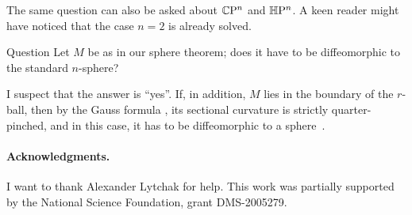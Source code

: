 \documentclass[a4paper,10pt]{article}
\begin{document}
The same question can also be asked about $\mathbb{C}\mathrm{P}^n$ and $\mathbb{H}\mathrm{P}^n$. 
A keen reader might have noticed that the case $n=2$ is already solved.

\begin{thm}{Question}
Let $M$ be as in our sphere theorem;
does it have to be diffeomorphic to the standard $n$-sphere?
\end{thm}


I suspect that the answer is ``yes''.
If, in addition, $M$ lies in the boundary of the $r$-ball, then by the Gauss formula \cite[Lemma 5]{petrunin2024}, its sectional curvature is strictly quarter-pinched,
and in this case, it has to be diffeomorphic to a sphere~\cite{brendle-schoen}.

\paragraph{Acknowledgments.}
I want to thank Alexander Lytchak for help.
This work was partially supported by the National Science Foundation, grant DMS-2005279.

{\sloppy
\def\emph{\textit}
\printbibliography[heading=bibintoc]
\fussy
}
\end{document}
